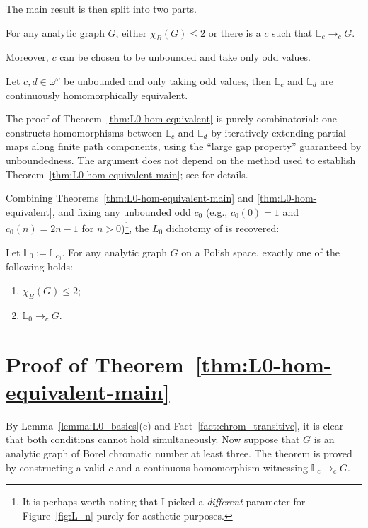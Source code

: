 \documentclass[12pt]{article}
\begin{document}
The main result is then split into two parts.

\begin{theorem}\label{thm:L0-hom-equivalent-main}
    For any analytic graph $G$, either $\chi_B(G)\leq 2$ or there is a $c$ such that $\mathbb L_c\to_cG$.
\end{theorem}

Moreover, $c$ can be chosen to be unbounded and take only odd values.

\begin{theorem}\label{thm:L0-hom-equivalent}
    Let $c,d\in\omega^\omega$ be unbounded and only taking odd values, then $\mathbb L_c$ and $\mathbb L_d$ are continuously homomorphically equivalent.
\end{theorem}

The proof of Theorem~\ref{thm:L0-hom-equivalent} is purely combinatorial: one constructs homomorphisms between $\mathbb L_c$ and $\mathbb L_d$ by iteratively extending partial maps along finite path components, using the ``large gap property'' guaranteed by unboundedness.
The argument does not depend on the method used to establish Theorem~\ref{thm:L0-hom-equivalent-main}; see \cite[Proposition~4.2 and Claim~4.1]{L0paper} for details.

Combining Theorems~\ref{thm:L0-hom-equivalent-main} and \ref{thm:L0-hom-equivalent}, and fixing any unbounded odd $c_0$ (e.g., $c_0(0)=1$ and $c_0(n)=2n-1$ for $n>0$)\footnote{It is perhaps worth noting that I picked a \emph{different} parameter for Figure~\ref{fig:L_n} purely for aesthetic purposes.}, the $L_0$ dichotomy of \cite{L0paper} is recovered:

\begin{corollary}
    Let $\mathbb L_0:=\mathbb L_{c_0}$.
    For any analytic graph $G$ on a Polish space, exactly one of the following holds:
    \begin{enumerate}[label=(\alph*)]
        \item $\chi_B(G)\leq 2$;
        \item $\mathbb L_0\to_cG$.
    \end{enumerate}
\end{corollary}

\section{Proof of Theorem~\ref{thm:L0-hom-equivalent-main}}

By Lemma~\ref{lemma:L0_basics}(c) and Fact~\ref{fact:chrom_transitive}, it is clear that both conditions cannot hold simultaneously.
Now suppose that $G$ is an analytic graph of Borel chromatic number at least three.
The theorem is proved by constructing a valid $c$ and a continuous homomorphism witnessing $\mathbb L_c\to_cG$.
\end{document}
